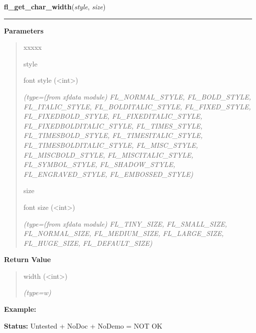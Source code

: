     \label{xformslib:library:fl_get_char_width}

    \vspace{0.5ex}

\hspace{.8\funcindent}\begin{boxedminipage}{\funcwidth}

    \raggedright \textbf{fl\_get\_char\_width}(\textit{style}, \textit{size})

    \vspace{-1.5ex}

    \rule{\textwidth}{0.5\fboxrule}
\setlength{\parskip}{2ex}
\setlength{\parskip}{1ex}
      \textbf{Parameters}
      \vspace{-1ex}

      \begin{quote}
        \begin{Ventry}{xxxxx}

          \item[style]

          font style ({\textless}int{\textgreater})

            {\it (type=(from xfdata module) FL\_NORMAL\_STYLE, FL\_BOLD\_STYLE, FL\_ITALIC\_STYLE,
FL\_BOLDITALIC\_STYLE, FL\_FIXED\_STYLE, FL\_FIXEDBOLD\_STYLE, 
FL\_FIXEDITALIC\_STYLE, FL\_FIXEDBOLDITALIC\_STYLE, FL\_TIMES\_STYLE, 
FL\_TIMESBOLD\_STYLE, FL\_TIMESITALIC\_STYLE, FL\_TIMESBOLDITALIC\_STYLE, 
FL\_MISC\_STYLE, FL\_MISCBOLD\_STYLE, FL\_MISCITALIC\_STYLE, 
FL\_SYMBOL\_STYLE, FL\_SHADOW\_STYLE, FL\_ENGRAVED\_STYLE, 
FL\_EMBOSSED\_STYLE)}

          \item[size]

          font size ({\textless}int{\textgreater})

            {\it (type=(from xfdata module) FL\_TINY\_SIZE, FL\_SMALL\_SIZE, FL\_NORMAL\_SIZE, 
FL\_MEDIUM\_SIZE, FL\_LARGE\_SIZE, FL\_HUGE\_SIZE, FL\_DEFAULT\_SIZE)}

        \end{Ventry}

      \end{quote}

      \textbf{Return Value}
    \vspace{-1ex}

      \begin{quote}
      width ({\textless}int{\textgreater})

      {\it (type=w)}

      \end{quote}

\textbf{Example:} 

\textbf{Status:} Untested + NoDoc + NoDemo = NOT OK



    \end{boxedminipage}

